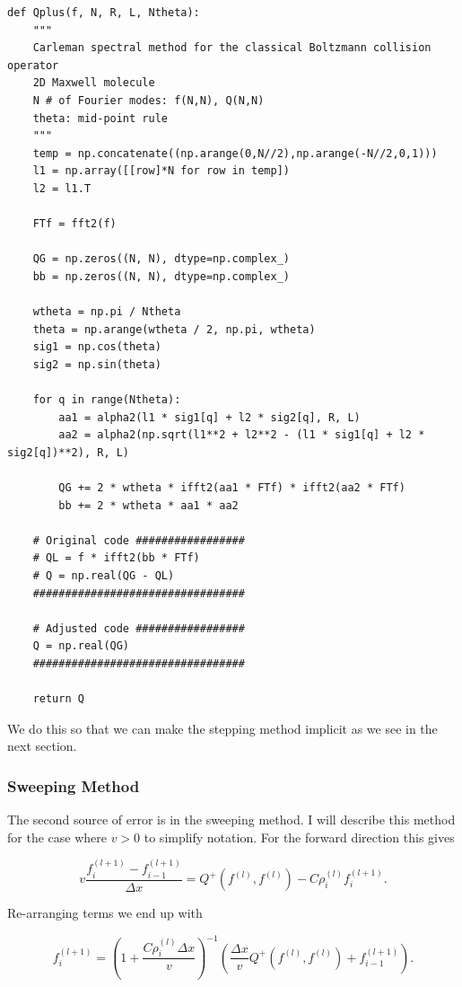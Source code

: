 \documentclass{article}
\def\t{\text}
\def\l{\left}
\def\r{\right}
\begin{document}
\begin{lstlisting}
def Qplus(f, N, R, L, Ntheta):
    """
    Carleman spectral method for the classical Boltzmann collision operator
    2D Maxwell molecule
    N # of Fourier modes: f(N,N), Q(N,N)
    theta: mid-point rule
    """
    temp = np.concatenate((np.arange(0,N//2),np.arange(-N//2,0,1)))
    l1 = np.array([[row]*N for row in temp])
    l2 = l1.T
    
    FTf = fft2(f)

    QG = np.zeros((N, N), dtype=np.complex_)
    bb = np.zeros((N, N), dtype=np.complex_)

    wtheta = np.pi / Ntheta
    theta = np.arange(wtheta / 2, np.pi, wtheta)
    sig1 = np.cos(theta)
    sig2 = np.sin(theta)

    for q in range(Ntheta):
        aa1 = alpha2(l1 * sig1[q] + l2 * sig2[q], R, L)
        aa2 = alpha2(np.sqrt(l1**2 + l2**2 - (l1 * sig1[q] + l2 * sig2[q])**2), R, L)

        QG += 2 * wtheta * ifft2(aa1 * FTf) * ifft2(aa2 * FTf)
        bb += 2 * wtheta * aa1 * aa2

    # Original code #################
    # QL = f * ifft2(bb * FTf)
    # Q = np.real(QG - QL)
    #################################

    # Adjusted code #################
    Q = np.real(QG)
    #################################

    return Q
\end{lstlisting}
\bigskip
We do this so that we can make the stepping method implicit as we see in the next section.
\subsubsection{Sweeping Method}
The second source of error is in the sweeping method. I will describe this method for the case where $v>0$ to simplify notation. For the forward direction this gives

\[
    v \frac{f_i^{(l+1)} - f_{i-1}^{(l+1)}}{\Delta x} = Q^+(f^{(l)}, f^{(l)}) - C \rho_i^{(l)} f_i^{(l+1)}.
\]

Re-arranging terms we end up with

\begin{equation}\label{eq:step}    
    f_i^{(l+1)} = \l(1 + \frac{C \rho_i^{(l)} \Delta x}{v}\r)^{-1} \l( \frac{\Delta x}{v} Q^+ \l(f^{(l)}, f^{(l)}\r) + f_{i-1}^{(l+1)} \r).
\end{equation}
\end{document}
